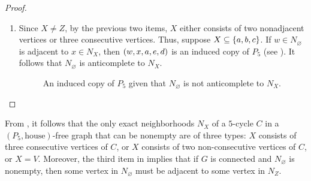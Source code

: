 \begin{proof}
\begin{enumerate}[label=(\roman*)]
\begin{figure}[htb!]
                \caption{An induced copy of the house given that $N_X$ is nonempty.}
                \label{fig:pre_2}
            \end{figure}
        
        \item Since $X \neq Z$, by the previous two items, $X$ either consists
            of two nonadjacent vertices or three consecutive vertices. Thus,
            suppose $X\subseteq \left\{a,b,c\right\}$. If $w \in N_{\varnothing}$ is
            adjacent to $x\in N_X$, then $\left(w,x,a,e,d\right)$ is an induced copy of
            $P_5$ (see ). It follows that $N_{\varnothing}$ is
            anticomplete to $N_X$.

            \begin{figure}[htb!]
                \centering
                \caption{An induced copy of $P_5$ given that $N_\varnothing$ is
                    not anticomplete to $N_X$.}
                \label{fig:pre_3}
            \end{figure}
    \end{enumerate}
\end{proof}

From , it follows that the only exact
neighborhoods $N_X$ of a $5$-cycle $C$ in a $(P_5, \text{house})$-free graph
that can be nonempty are of three types: $X$ consists of three consecutive
vertices of $C$, or $X$ consists of two non-consecutive vertices of $C$, or
$X=V$.  Moreover, the third item in  implies that
if $G$ is connected and $N_\varnothing$ is nonempty, then some vertex in
$N_\varnothing$ must be adjacent to some vertex in $N_Z$.

